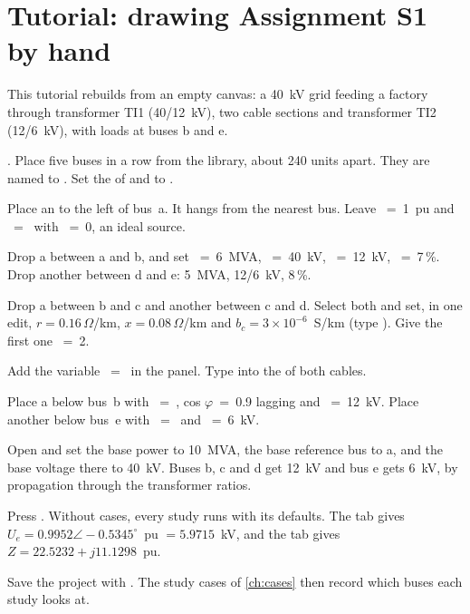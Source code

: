 \section{Tutorial: drawing Assignment S1 by hand}\label{sec:tutorial-s1}

This tutorial rebuilds  from an empty canvas: a 40~kV grid
feeding a factory through transformer TI1 (40/12~kV), two cable sections and transformer
TI2 (12/6~kV), with loads at buses b and e.

\begin{steps}
  \item {}. Place five buses in a row from the library, about 240 units
    apart. They are named  to . Set the  of  and
     to .
  \item Place an  to the left of bus~a. It hangs from the nearest bus.
    Leave ~=~1~pu and ~=~ with ~=~0, an ideal source.
  \item Drop a  between a and b, and set ~=~6~MVA, ~=~40~kV, ~=~12~kV, ~=~7\,\%. Drop another between d
    and e: 5~MVA, 12/6~kV, 8\,\%.
  \item Drop a  between b and c and another between c and d. Select
    both and set, in one edit, $r=0.16\,\Omega$/km, $x=0.08\,\Omega$/km and
    $b_c=3\times10^{-6}$~S/km (type ). Give the first one ~=~2.
  \item Add the variable ~=~ in the  panel. Type
     into the  of both cables.
  \item Place a  below bus~b with ~=~, cos
    $\varphi$~=~0.9 lagging and ~=~12~kV. Place another below bus~e with
    ~=~ and ~=~6~kV.
  \item Open  and set the base power to 10~MVA, the base
    reference bus to a, and the base voltage there to 40~kV. Buses b, c and d get 12~kV
    and bus e gets 6~kV, by propagation through the transformer ratios.
  \item Press . Without cases, every study runs with its defaults. The
     tab gives $U_e = 0.9952\angle-0.5345^\circ$~pu $=
    5.9715$~kV, and the  tab gives $Z = 22.5232 + j11.1298$~pu.
\end{steps}

Save the project with . The study cases of \cref{ch:cases} then record
which buses each study looks at.
